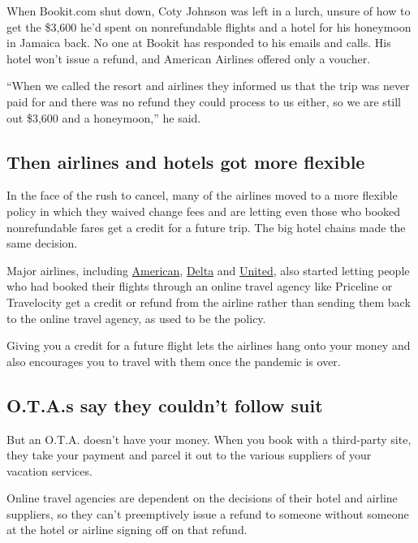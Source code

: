 When Bookit.com shut down, Coty Johnson was left in a lurch, unsure of
how to get the \$3,600 he'd spent on nonrefundable flights and a hotel
for his honeymoon in Jamaica back. No one at Bookit has responded to his
emails and calls. His hotel won't issue a refund, and American Airlines
offered only a voucher.

``When we called the resort and airlines they informed us that the trip
was never paid for and there was no refund they could process to us
either, so we are still out \$3,600 and a honeymoon,'' he said.

\hypertarget{then-airlines-and-hotels-got-more-flexible}{%
\subsection{Then airlines and hotels got more
flexible}\label{then-airlines-and-hotels-got-more-flexible}}

In the face of the rush to cancel, many of the airlines moved to a more
flexible policy in which they waived change fees and are letting even
those who booked nonrefundable fares get a credit for a future trip. The
big hotel chains made the same decision.

Major airlines, including
\href{https://www.aa.com/i18n/travel-info/coronavirus-updates.jsp}{American},
\href{https://www.delta.com/mytrips/}{Delta} and
\href{https://www.united.com/en/us/manageres/mytrips}{United}, also
started letting people who had booked their flights through an online
travel agency like Priceline or Travelocity get a credit or refund from
the airline rather than sending them back to the online travel agency,
as used to be the policy.

Giving you a credit for a future flight lets the airlines hang onto your
money and also encourages you to travel with them once the pandemic is
over.

\hypertarget{otas-say-they-couldnt-follow-suit}{%
\subsection{O.T.A.s say they couldn't follow
suit}\label{otas-say-they-couldnt-follow-suit}}

But an O.T.A. doesn't have your money. When you book with a third-party
site, they take your payment and parcel it out to the various suppliers
of your vacation services.

Online travel agencies are dependent on the decisions of their hotel and
airline suppliers, so they can't preemptively issue a refund to someone
without someone at the hotel or airline signing off on that refund.

